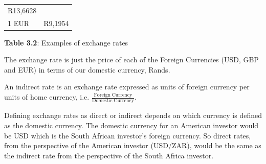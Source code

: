 {\begin{center}
\begin{xtabular*}{\mytablewidth}[t]{|p{10\mystarwidth}|p{10\mystarwidth}|}
        R13,6628%
     \tabularnewline{}
    
    
        1 EUR &
    
    
        R9,1954%
     \tabularnewline{}
    \end{xtabular*}
      \end{center}
    \begin{center}{\small\bfseries Table 3.2}: Examples of exchange rates\end{center}
    
    \addtocounter{footnote}{-0}
    
        }%
      
    \par
  
          \label{m39335*id67685}The exchange rate is just the price of each of the Foreign Currencies (USD, GBP and EUR) in terms of our domestic currency, Rands.\par 
          \label{m39335*id67689}An indirect rate is an exchange rate expressed as units of foreign currency per units of home currency, i.e. \begin{math}\frac{\mathrm{Foreign\; Currency}}{\mathrm{Domestic\; Currency}}\end{math}.\par 
          \label{m39335*id67712}Defining exchange rates as direct or indirect depends on which currency is defined as the domestic currency. The domestic currency for an American investor would be USD which is the South African investor's foreign currency. So direct rates, from the perspective of the American investor (USD/ZAR), would be the same as the indirect rate from the perspective of the South Africa investor.\par 
        

